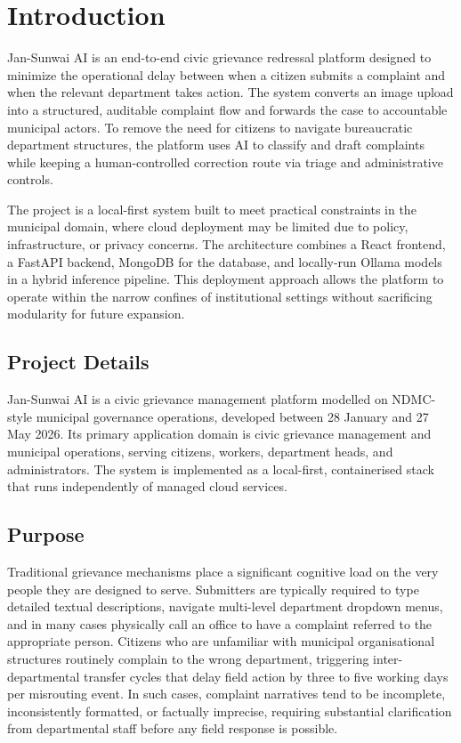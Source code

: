 \chapter{Introduction}

Jan-Sunwai AI is an end-to-end civic grievance redressal platform designed to minimize the operational delay between when a citizen submits a complaint and when the relevant department takes action. The system converts an image upload into a structured, auditable complaint flow and forwards the case to accountable municipal actors. To remove the need for citizens to navigate bureaucratic department structures, the platform uses AI to classify and draft complaints while keeping a human-controlled correction route via triage and administrative controls.

The project is a local-first system built to meet practical constraints in the municipal domain, where cloud deployment may be limited due to policy, infrastructure, or privacy concerns. The architecture combines a React frontend, a FastAPI backend, MongoDB for the database, and locally-run Ollama models in a hybrid inference pipeline. This deployment approach allows the platform to operate within the narrow confines of institutional settings without sacrificing modularity for future expansion.

\section{Project Details}
\label{sec:project-details}

Jan-Sunwai AI is a civic grievance management platform modelled on NDMC-style municipal governance operations, developed between 28 January and 27 May 2026. Its primary application domain is civic grievance management and municipal operations, serving citizens, workers, department heads, and administrators. The system is implemented as a local-first, containerised stack that runs independently of managed cloud services.

\section{Purpose}

Traditional grievance mechanisms place a significant cognitive load on the very people they are designed to serve. Submitters are typically required to type detailed textual descriptions, navigate multi-level department dropdown menus, and in many cases physically call an office to have a complaint referred to the appropriate person. Citizens who are unfamiliar with municipal organisational structures routinely complain to the wrong department, triggering inter-departmental transfer cycles that delay field action by three to five working days per misrouting event. In such cases, complaint narratives tend to be incomplete, inconsistently formatted, or factually imprecise, requiring substantial clarification from departmental staff before any field response is possible.

